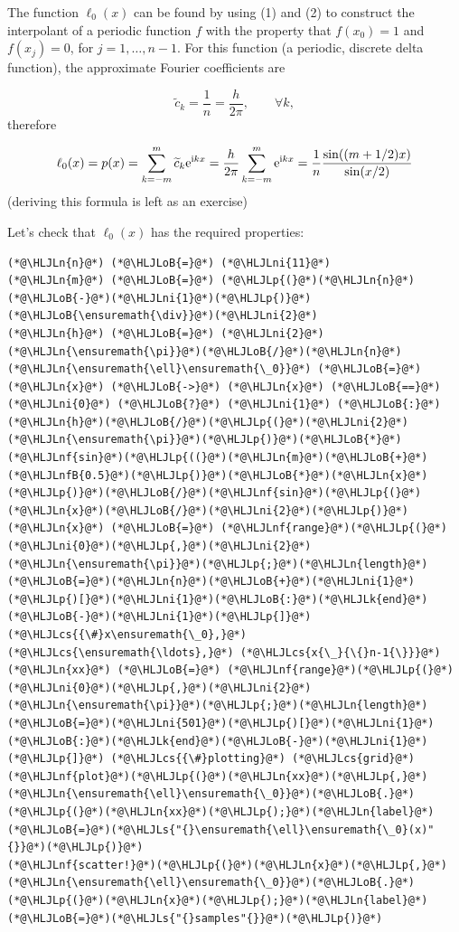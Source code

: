 \documentclass[12pt,landscape]{article}
\newcommand{\HLJLk}[1]{\textcolor[RGB]{148,91,176}{\textbf{#1}}}
\newcommand{\HLJLn}[1]{#1}
\newcommand{\HLJLnf}[1]{\textcolor[RGB]{66,102,213}{#1}}
\newcommand{\HLJLs}[1]{\textcolor[RGB]{201,61,57}{#1}}
\newcommand{\HLJLnfB}[1]{\textcolor[RGB]{59,151,46}{#1}}
\newcommand{\HLJLni}[1]{\textcolor[RGB]{59,151,46}{#1}}
\newcommand{\HLJLoB}[1]{\textcolor[RGB]{102,102,102}{\textbf{#1}}}
\newcommand{\HLJLp}[1]{#1}
\newcommand{\HLJLcs}[1]{\textcolor[RGB]{153,153,119}{\textit{#1}}}
\begin{document}
{The function $\ell_0(x)$ can be found by using (1) and (2) to construct the interpolant of a periodic function $f$ with the property that $f(x_0) = 1$ and $f(x_j) = 0$, for $j = 1, \ldots, n-1$. For this function (a periodic, discrete delta function), the approximate Fourier coefficients are

\[
\widetilde{c}_{k} = \frac{1}{n} = \frac{h}{2\pi}, \qquad \forall k,
\]
therefore

\[
\ell_0(x) = p(x) = \sum_{k=-m}^{m} \widetilde{c}_k{\rm e}^{{\rm i}kx} = \frac{h}{2\pi}\sum_{k=-m}^{m} {\rm e}^{{\rm i}kx} = \frac{1}{n}\frac{\sin((m+1/2)x)}{\sin(x/2)}
\]
(deriving this formula is left as an exercise)

Let's check that $\ell_0(x)$ has the required properties:


\begin{lstlisting}
(*@\HLJLn{n}@*) (*@\HLJLoB{=}@*) (*@\HLJLni{11}@*)
(*@\HLJLn{m}@*) (*@\HLJLoB{=}@*) (*@\HLJLp{(}@*)(*@\HLJLn{n}@*)(*@\HLJLoB{-}@*)(*@\HLJLni{1}@*)(*@\HLJLp{)}@*)(*@\HLJLoB{\ensuremath{\div}}@*)(*@\HLJLni{2}@*)
(*@\HLJLn{h}@*) (*@\HLJLoB{=}@*) (*@\HLJLni{2}@*)(*@\HLJLn{\ensuremath{\pi}}@*)(*@\HLJLoB{/}@*)(*@\HLJLn{n}@*)
(*@\HLJLn{\ensuremath{\ell}\ensuremath{\_0}}@*) (*@\HLJLoB{=}@*) (*@\HLJLn{x}@*) (*@\HLJLoB{->}@*) (*@\HLJLn{x}@*) (*@\HLJLoB{==}@*) (*@\HLJLni{0}@*) (*@\HLJLoB{?}@*) (*@\HLJLni{1}@*) (*@\HLJLoB{:}@*) (*@\HLJLn{h}@*)(*@\HLJLoB{/}@*)(*@\HLJLp{(}@*)(*@\HLJLni{2}@*)(*@\HLJLn{\ensuremath{\pi}}@*)(*@\HLJLp{)}@*)(*@\HLJLoB{*}@*)(*@\HLJLnf{sin}@*)(*@\HLJLp{((}@*)(*@\HLJLn{m}@*)(*@\HLJLoB{+}@*)(*@\HLJLnfB{0.5}@*)(*@\HLJLp{)}@*)(*@\HLJLoB{*}@*)(*@\HLJLn{x}@*)(*@\HLJLp{)}@*)(*@\HLJLoB{/}@*)(*@\HLJLnf{sin}@*)(*@\HLJLp{(}@*)(*@\HLJLn{x}@*)(*@\HLJLoB{/}@*)(*@\HLJLni{2}@*)(*@\HLJLp{)}@*)
(*@\HLJLn{x}@*) (*@\HLJLoB{=}@*) (*@\HLJLnf{range}@*)(*@\HLJLp{(}@*)(*@\HLJLni{0}@*)(*@\HLJLp{,}@*)(*@\HLJLni{2}@*)(*@\HLJLn{\ensuremath{\pi}}@*)(*@\HLJLp{;}@*)(*@\HLJLn{length}@*)(*@\HLJLoB{=}@*)(*@\HLJLn{n}@*)(*@\HLJLoB{+}@*)(*@\HLJLni{1}@*)(*@\HLJLp{)[}@*)(*@\HLJLni{1}@*)(*@\HLJLoB{:}@*)(*@\HLJLk{end}@*)(*@\HLJLoB{-}@*)(*@\HLJLni{1}@*)(*@\HLJLp{]}@*) (*@\HLJLcs{{\#}x\ensuremath{\_0},}@*) (*@\HLJLcs{\ensuremath{\ldots},}@*) (*@\HLJLcs{x{\_}{\{}n-1{\}}}@*)
(*@\HLJLn{xx}@*) (*@\HLJLoB{=}@*) (*@\HLJLnf{range}@*)(*@\HLJLp{(}@*)(*@\HLJLni{0}@*)(*@\HLJLp{,}@*)(*@\HLJLni{2}@*)(*@\HLJLn{\ensuremath{\pi}}@*)(*@\HLJLp{;}@*)(*@\HLJLn{length}@*)(*@\HLJLoB{=}@*)(*@\HLJLni{501}@*)(*@\HLJLp{)[}@*)(*@\HLJLni{1}@*)(*@\HLJLoB{:}@*)(*@\HLJLk{end}@*)(*@\HLJLoB{-}@*)(*@\HLJLni{1}@*)(*@\HLJLp{]}@*) (*@\HLJLcs{{\#}plotting}@*) (*@\HLJLcs{grid}@*)
(*@\HLJLnf{plot}@*)(*@\HLJLp{(}@*)(*@\HLJLn{xx}@*)(*@\HLJLp{,}@*)(*@\HLJLn{\ensuremath{\ell}\ensuremath{\_0}}@*)(*@\HLJLoB{.}@*)(*@\HLJLp{(}@*)(*@\HLJLn{xx}@*)(*@\HLJLp{);}@*)(*@\HLJLn{label}@*)(*@\HLJLoB{=}@*)(*@\HLJLs{"{}\ensuremath{\ell}\ensuremath{\_0}(x)"{}}@*)(*@\HLJLp{)}@*)
(*@\HLJLnf{scatter!}@*)(*@\HLJLp{(}@*)(*@\HLJLn{x}@*)(*@\HLJLp{,}@*)(*@\HLJLn{\ensuremath{\ell}\ensuremath{\_0}}@*)(*@\HLJLoB{.}@*)(*@\HLJLp{(}@*)(*@\HLJLn{x}@*)(*@\HLJLp{);}@*)(*@\HLJLn{label}@*)(*@\HLJLoB{=}@*)(*@\HLJLs{"{}samples"{}}@*)(*@\HLJLp{)}@*)
\end{lstlisting}

}
\end{document}

